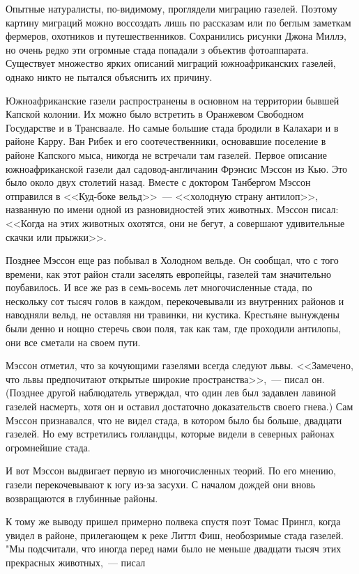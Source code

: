 \documentclass[12pt,a4paper,twoside,openany,svgnames]{memoir}
\begin{document}
Опытные натуралисты, по-видимому, проглядели миграцию газелей. Поэтому картину миграций можно воссоздать лишь по рассказам или по беглым заметкам фермеров, охотников и путешественников. Сохранились рисунки Джона Миллэ, но очень редко эти огромные стада попадали з объектив фотоаппарата. Существует множество ярких описаний миграций южноафриканских газелей, однако никто не пытался объяснить их причину.

Южноафриканские газели распространены в основном на территории бывшей Капской колонии. Их можно было встретить в Оранжевом Свободном Государстве и в Трансваале. Но самые большие стада бродили в Калахари и в районе Карру. Ван Рибек и его соотечественники, основавшие поселение в районе Капского мыса, никогда не встречали там газелей. Первое описание южноафриканской газели дал садовод-англичанин Фрэнсис Мэссон из Кью. Это было около двух столетий назад. Вместе с доктором Танбергом Мэссон отправился в <<Куд-боке вельд>>~--- <<холодную страну антилоп>>, названную по имени одной из разновидностей этих животных. Мэссон писал: <<Когда на этих животных охотятся, они не бегут, а совершают удивительные скачки или прыжки>>.

Позднее Мэссон еще раз побывал в Холодном вельде. Он сообщал, что с того времени, как этот район стали заселять европейцы, газелей там значительно поубавилось. И все же раз в семь-восемь лет многочисленные стада, по нескольку сот тысяч голов в каждом, перекочевывали из внутренних районов и наводняли вельд, не оставляя ни травинки, ни кустика. Крестьяне вынуждены были денно и нощно стеречь свои поля, так как там, где проходили антилопы, они все сметали на своем пути.

Мэссон отметил, что за кочующими газелями всегда следуют львы. <<Замечено, что львы предпочитают открытые широкие пространства>>,~--- писал он. (Позднее другой наблюдатель утверждал, что один лев был задавлен лавиной газелей насмерть, хотя он и оставил достаточно доказательств своего гнева.) Сам Мэссон признавался, что не видел стада, в котором было бы больше, двадцати газелей. Но ему встретились голландцы, которые видели в северных районах огромнейшие стада.

И вот Мэссон выдвигает первую из многочисленных теорий. По его мнению, газели перекочевывают к югу из-за засухи. С началом дождей они вновь возвращаются в глубинные районы.

К тому же выводу пришел примерно полвека спустя поэт Томас Прингл, когда увидел в районе, прилегающем к реке Литтл Фиш, необозримые стада газелей. "Мы подсчитали, что иногда перед нами было не меньше двадцати тысяч этих прекрасных животных,~--- писал
\end{document}
